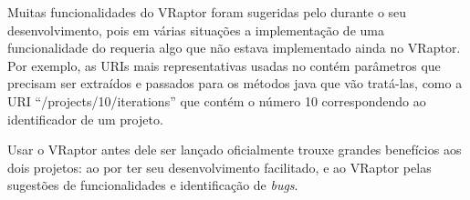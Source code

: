 Muitas funcionalidades do VRaptor foram sugeridas pelo \calopsita durante o seu desenvolvimento, pois em várias situações a implementação de uma funcionalidade do \calopsita{} requeria algo que não estava implementado ainda no VRaptor. Por exemplo, as URIs mais representativas usadas no \calopsita{} contém parâmetros que precisam ser extraídos e passados para os métodos java que vão tratá-las, como a URI ``/projects/10/iterations'' que contém o número 10 correspondendo ao identificador de um projeto.

Usar o VRaptor antes dele ser lançado oficialmente trouxe grandes benefícios aos dois projetos: ao \calopsita{} por ter seu desenvolvimento facilitado, e ao VRaptor pelas sugestões de funcionalidades e identificação de \textit{bugs}.
